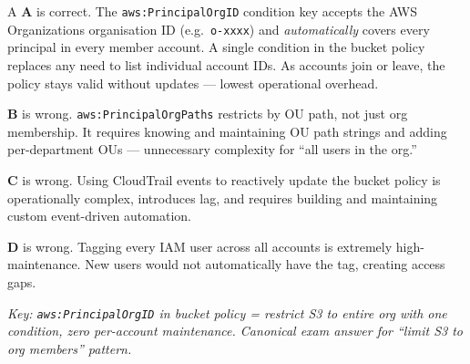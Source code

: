\begin{answer}{A}
\textbf{A} is correct. The \texttt{aws:PrincipalOrgID} condition key accepts the AWS Organizations organisation ID (e.g.\ \texttt{o-xxxx}) and \emph{automatically} covers every principal in every member account. A single condition in the bucket policy replaces any need to list individual account IDs. As accounts join or leave, the policy stays valid without updates --- lowest operational overhead.

\textbf{B} is wrong. \texttt{aws:PrincipalOrgPaths} restricts by OU path, not just org membership. It requires knowing and maintaining OU path strings and adding per-department OUs --- unnecessary complexity for ``all users in the org.''

\textbf{C} is wrong. Using CloudTrail events to reactively update the bucket policy is operationally complex, introduces lag, and requires building and maintaining custom event-driven automation.

\textbf{D} is wrong. Tagging every IAM user across all accounts is extremely high-maintenance. New users would not automatically have the tag, creating access gaps.

\textit{Key: \texttt{aws:PrincipalOrgID} in bucket policy = restrict S3 to entire org with one condition, zero per-account maintenance. Canonical exam answer for ``limit S3 to org members'' pattern.}
\end{answer}

